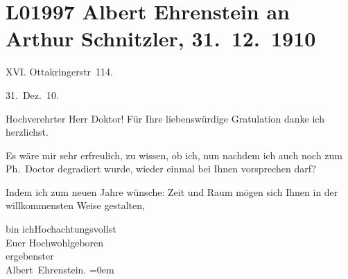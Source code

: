 

\section[Albert Ehrenstein an Arthur Schnitzler, 31. 12. 1910]{L01997 Albert Ehrenstein an Arthur Schnitzler, 31. 12. 1910}
\nopagebreak{}
\rehead{ }\normalsize\beginnumbering{}
\toendnotes[C]{\smallbreak\pagebreak[2]}
\pstart
           
\pstart
           {\pb}XVI. Ottakringerstr 114.\pend
           
\pstart
           \raggedleft{}31. Dez. 10.\pend
           \pend
           
\pstart\center{}Hochverehrter Herr Doktor!\pend\vspace{0.5em}
\pstart
           Für Ihre liebenswürdige Gratulation danke ich herzlichst.\pend
           
\pstart
           Es wäre mir sehr erfreulich, zu wissen, ob ich, nun nachdem ich auch noch zum
               Ph. Doctor degradiert wurde, wieder einmal bei Ihnen vorsprechen darf?\pend
           
\pstart
           Indem ich zum neuen Jahre wünsche: Zeit und Raum mögen sich Ihnen in der
               willkommensten Weise gestalten,\pend
           
\pstart
           bin ich\hspace*{2em}Hochachtungsvollst{\\[\baselineskip]}Euer Hochwohlgeboren{\\[\baselineskip]}ergebenster{\\[\baselineskip]}\spacefill\mbox{Albert Ehrenstein.}\pend
           \leftskip=0em{}\endnumbering{}  
      